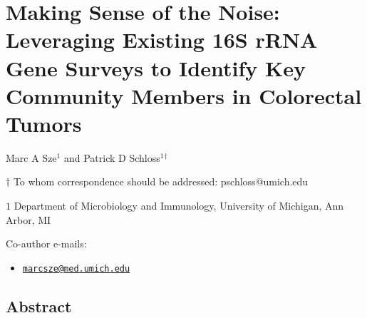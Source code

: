 \documentclass[12pt,]{article}
\title{}
\author{}
\date{}
\providecommand{\tightlist}{%
  \setlength{\itemsep}{0pt}\setlength{\parskip}{0pt}}
\begin{document}
\section{Making Sense of the Noise: Leveraging Existing 16S rRNA Gene
Surveys to Identify Key Community Members in Colorectal
Tumors}\label{making-sense-of-the-noise-leveraging-existing-16s-rrna-gene-surveys-to-identify-key-community-members-in-colorectal-tumors}

\begin{center}
\vspace{25mm}

Marc A Sze${^1}$ and Patrick D Schloss${^1}$${^\dagger}$

\vspace{20mm}

$\dagger$ To whom correspondence should be addressed: pschloss@umich.edu

$1$ Department of Microbiology and Immunology, University of Michigan, Ann Arbor, MI




\end{center}

Co-author e-mails:

\begin{itemize}
\tightlist
\item
  \href{mailto:marcsze@med.umich.edu}{\nolinkurl{marcsze@med.umich.edu}}
\end{itemize}

\newpage

\linenumbers

\subsection{Abstract}\label{abstract}
\end{document}
